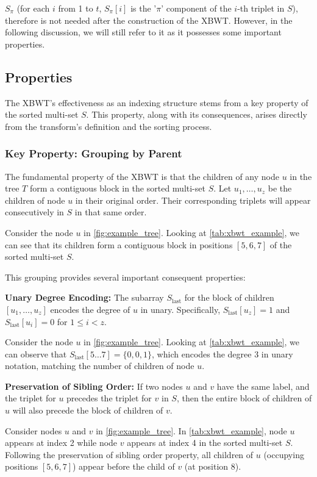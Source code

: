 $S_{\pi}$ (for each $i$ from 1 to $t$, $S_{\pi}[i]$ is the '$\pi$' component of the $i$-th triplet in $S$), therefore is not needed after the construction of the XBWT. However, in the following discussion, we will still refer to it as it possesses some important properties.

\subsection{Properties}
The XBWT's effectiveness as an indexing structure stems from a key property of the sorted multi-set $S$. This property, along with its consequences, arises directly from the transform's definition and the sorting process.

\subsubsection{Key Property: Grouping by Parent}

The fundamental property of the XBWT is that the children of any node $u$ in the tree $T$ form a contiguous block in the sorted multi-set $S$. Let $u_1, \dots, u_z$ be the children of node $u$ in their original order. Their corresponding triplets will appear consecutively in $S$ in that same order.
\begin{example}
    Consider the node $u$ in \cref{fig:example_tree}. Looking at \cref{tab:xbwt_example}, we can see that its children form a contiguous block in positions $[5, 6, 7]$ of the sorted multi-set $S$.
\end{example}

This grouping provides several important consequent properties:

\textbf{Unary Degree Encoding:} The subarray $S_{\text{last}}$ for the block of children $[u_1, \dots, u_z]$ encodes the degree of $u$ in unary. Specifically, $S_{\text{last}}[u_z] = 1$ and $S_{\text{last}}[u_i] = 0$ for $1 \leq i < z$. 
\begin{example}
    Consider the node $u$ in \cref{fig:example_tree}. Looking at \cref{tab:xbwt_example}, we can observe that $S_{\text{last}}[5 \dots 7] = \{0, 0, 1\}$, which encodes the degree 3 in unary notation, matching the number of children of node $u$.
\end{example}

\textbf{Preservation of Sibling Order:} If two nodes $u$ and $v$ have the same label, and the triplet for $u$ precedes the triplet for $v$ in $S$, then the entire block of children of $u$ will also precede the block of children of $v$.
\begin{example}
    Consider nodes $u$ and $v$ in \cref{fig:example_tree}. In \cref{tab:xbwt_example}, node $u$ appears at index 2 while node $v$ appears at index 4 in the sorted multi-set $S$. Following the preservation of sibling order property, all children of $u$ (occupying positions $[5, 6, 7]$) appear before the child of $v$ (at position $8$).
\end{example}

